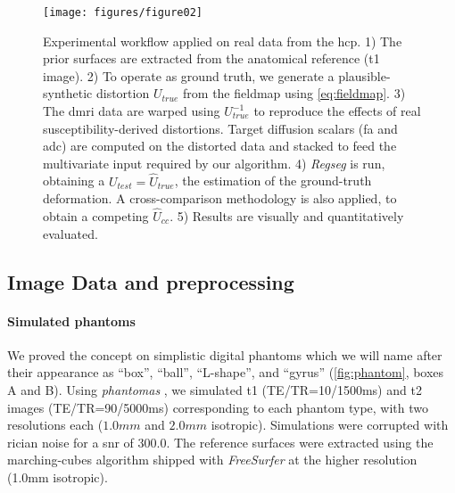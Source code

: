 \begin{figure*}
\texttt{[image: figures/figure02]}
\caption{Experimental workflow applied on real data from the \acrfull*{hcp}.
  1) The prior surfaces are extracted from the anatomical reference (\gls*{t1} image).
	2) To operate as ground truth, we generate a plausible-synthetic distortion $U_{true}$
	  from the fieldmap using \eqref{eq:fieldmap}.
	3) The \gls*{dmri} data are warped using $U^{-1}_{true}$ to reproduce the effects of real
	  susceptibility-derived distortions.
	Target diffusion scalars (\gls*{fa} and \gls*{adc}) are computed on the distorted data and
		stacked to feed the multivariate input required by our algorithm.
	4) \emph{Regseg} is run, obtaining a $U_{test} = \hat{U}_{true}$, the estimation of
	  the ground-truth deformation.
	  A cross-comparison methodology is also applied, to obtain a competing $\hat{U}_{cc}$.
	5) Results are visually and quantitatively evaluated.}\label{fig:evworkflows}
\end{figure*}


\subsection{Image Data and preprocessing}
\label{sec:datasets}

\paragraph*{Simulated phantoms}%
\label{sec:digital_phantoms}
We proved the concept on simplistic digital phantoms which we will name after their
  appearance as ``box'', ``ball'', ``L-shape'', and ``gyrus'' (\autoref{fig:phantom},
  boxes A and B).
Using \emph{phantomas} \citep{caruyer_phantomas_2014}, we simulated
  \gls*{t1} (TE/TR=10/1500ms) and \gls*{t2} images (TE/TR=90/5000ms)
  corresponding to each phantom type, with two resolutions each
  ($1.0mm$ and $2.0mm$ isotropic).
Simulations were corrupted with rician noise for a \gls*{snr} of 300.0.
The reference surfaces were extracted using the marching-cubes algorithm
  shipped with \emph{FreeSurfer} \citep{fischl_freesurfer_2012}
  at the higher resolution (1.0mm isotropic).

